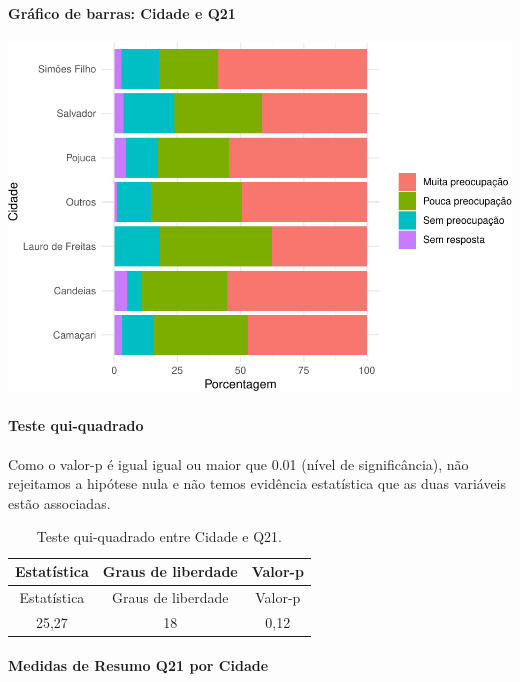 \documentclass[]{article}
\let\oldparagraph\paragraph
\renewcommand{\paragraph}[1]{\oldparagraph{#1}\mbox{}}
\begin{document}
\hypertarget{gruxe1fico-de-barras-cidade-e-q21}{%
\paragraph{Gráfico de barras: Cidade e Q21}\label{gruxe1fico-de-barras-cidade-e-q21}}

\begin{center}\includegraphics[width=0.75\linewidth]{relatorio_covid19_files/figure-latex/unnamed-chunk-426-1} \end{center}

\hypertarget{teste-qui-quadrado-37}{%
\paragraph{Teste qui-quadrado}\label{teste-qui-quadrado-37}}

Como o valor-p é igual igual ou maior que 0.01 (nível de significância), não rejeitamos a hipótese nula e não temos evidência estatística que as duas variáveis estão associadas.

\begin{longtable}[]{@{}ccc@{}}
\caption{\label{tab:unnamed-chunk-428}Teste qui-quadrado entre Cidade e Q21.}\tabularnewline
\toprule
Estatística & Graus de liberdade & Valor-p\tabularnewline
\midrule
\endfirsthead
\toprule
Estatística & Graus de liberdade & Valor-p\tabularnewline
\midrule
\endhead
25,27 & 18 & 0,12\tabularnewline
\bottomrule
\end{longtable}

\cleardoublepage

\hypertarget{medidas-de-resumo-q21-por-cidade}{%
\paragraph{Medidas de Resumo Q21 por Cidade}\label{medidas-de-resumo-q21-por-cidade}}
\end{document}
